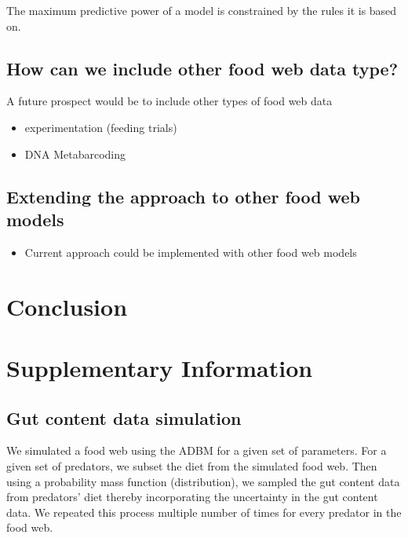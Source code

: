 \documentclass{article}
\begin{document}
The maximum predictive power of a model is constrained by the rules it
is based on.

\hypertarget{how-can-we-include-other-food-web-data-type}{%
\subsection{How can we include other food web data
type?}\label{how-can-we-include-other-food-web-data-type}}

A future prospect would be to include other types of food web data

\begin{itemize}
\item
  experimentation (feeding trials)
\item
  DNA Metabarcoding
\end{itemize}

\hypertarget{extending-the-approach-to-other-food-web-models}{%
\subsection{Extending the approach to other food web
models}\label{extending-the-approach-to-other-food-web-models}}

\begin{itemize}
\tightlist
\item
  Current approach could be implemented with other food web models
\end{itemize}

\hypertarget{conclusion}{%
\section{Conclusion}\label{conclusion}}

\hypertarget{supplementary-information}{%
\section{Supplementary Information}\label{supplementary-information}}

\hypertarget{gut-content-data-simulation}{%
\subsection{Gut content data
simulation}\label{gut-content-data-simulation}}

We simulated a food web using the ADBM for a given set of parameters.
For a given set of predators, we subset the diet from the simulated food
web. Then using a probability mass function (distribution), we sampled
the gut content data from predators' diet thereby incorporating the
uncertainty in the gut content data. We repeated this process multiple
number of times for every predator in the food web.
\end{document}
